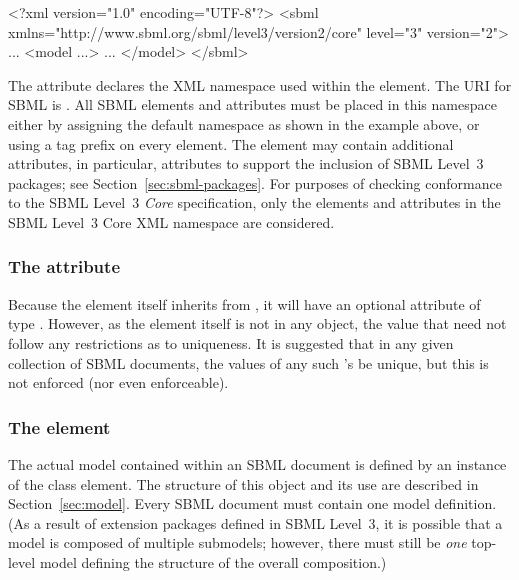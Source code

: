 \begin{example}
<?xml version="1.0" encoding="UTF-8"?>
<sbml xmlns="http://www.sbml.org/sbml/level3/version2/core" level="3" version="2">
  ...
  <model ...>
     ...
  </model>
</sbml>
\end{example}

The attribute  declares the XML namespace used within
the  element.  The URI for SBML \thisLV is
.  All SBML
\thisLV elements and attributes must be placed in this namespace
either by assigning the default namespace as shown in the example
above, or using a tag prefix on every element.  The 
element may contain additional attributes, in particular,
attributes to support the inclusion of SBML Level~3 packages; see
Section~\ref{sec:sbml-packages}.  For purposes of checking
conformance to the SBML Level~3 \emph{Core} specification, only
the elements and attributes in the SBML Level~3 Core XML namespace
are considered.

\begin{blockChanged}
\subsubsection{The  attribute}

Because the \SBML element itself inherits from \SBase, it will have an optional  attribute of type .  However, as the \SBML element itself is not in any \Model object, the value that  need not follow any restrictions as to uniqueness.  It is suggested that in any given collection of SBML documents, the values of any such 's be unique, but this is not enforced (nor even enforceable).
\end{blockChanged}

\subsubsection{The  element}

The actual model contained within an SBML document is defined by
an instance of the \Model class element.  The structure of this
object and its use are described in Section~\ref{sec:model}.
Every SBML document must contain one model definition.  (As a
result of extension packages defined in SBML Level~3, it is
possible that a model is composed of multiple submodels; however,
there must still be \emph{one} top-level model defining the
structure of the overall composition.)


